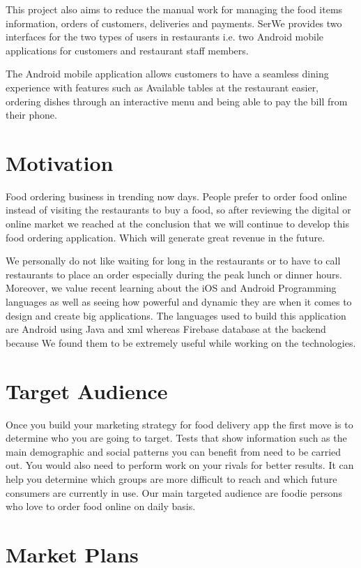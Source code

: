 \documentclass[12pt]{article}
\begin{document}
This project also aims to reduce the manual work for managing the food items information, orders of customers, deliveries and payments. SerWe provides two interfaces for the two types of users in restaurants i.e. two Android mobile applications for customers and restaurant staff members.

The Android mobile application allows customers to have a seamless dining experience with features such as Available tables at the restaurant easier, ordering dishes through an interactive menu and being able to pay the bill from their phone.

\section{Motivation}

Food ordering business in trending now days. People prefer to order food online instead of visiting the restaurants to buy a food, so after reviewing the digital or online market we reached at the conclusion that we will continue to develop this food ordering application. Which will generate great revenue in the future.

We personally do not like waiting for long in the restaurants or to have to call restaurants to place an order especially during the peak lunch or dinner hours. Moreover, we value recent learning about the iOS and Android Programming languages as well as seeing how powerful and dynamic they are when it comes to design and create big applications. The languages used to build this application are Android using Java and xml whereas Firebase database at the backend because We found them to be extremely useful while working on the technologies.

\section{Target Audience}

Once you build your marketing strategy for food delivery app the first move is to determine who you are going to target. Tests that show information such as the main demographic and social patterns you can benefit from need to be carried out. You would also need to perform work on your rivals for better results. It can help you determine which groups are more difficult to reach and which future consumers are currently in use. Our main targeted audience are foodie persons who love to order food online on daily basis. 

\section{Market Plans}
\end{document}
